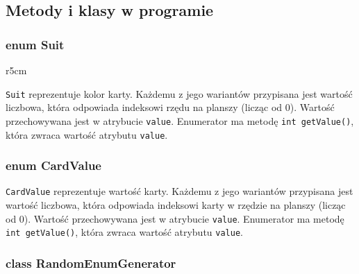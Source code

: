 \documentclass{article}
\newenvironment{enum}[3][]%
{
\begin{classAndInterfaceCommon}{#1}{#2}{#3}
}%
{\node[umlcd style enum, anchor=north] (\umlcdClassName) at (\umlcdClassPos)
    {$<<$enumeration$>>$ \\ \textbf{\umlcdClassName}
\nodepart{second}
\umlcdClassAttributes
};
\end{classAndInterfaceCommon}
}
\begin{document}
\subsection{Metody i klasy w programie}

\subsubsection*{enum Suit}

\setlength{\columnsep}{10pt}
\begin{wrapfigure}{r}{5cm}
    \centering
{}
\end{wrapfigure}

\texttt{Suit} reprezentuje kolor karty. Każdemu z jego wariantów przypisana jest wartość liczbowa, która odpowiada indeksowi rzędu na planszy (licząc od 0). Wartość przechowywana jest w atrybucie \texttt{value}. Enumerator ma metodę \texttt{int getValue()}, która zwraca wartość atrybutu \texttt{value}.

\subsubsection*{enum CardValue}
\texttt{CardValue} reprezentuje wartość karty. Każdemu z jego wariantów przypisana jest wartość liczbowa, która odpowiada indeksowi karty w rzędzie na planszy (licząc od 0). Wartość przechowywana jest w atrybucie \texttt{value}. Enumerator ma metodę \texttt{int getValue()}, która zwraca wartość atrybutu \texttt{value}.

\subsubsection*{class RandomEnumGenerator}
\end{document}
